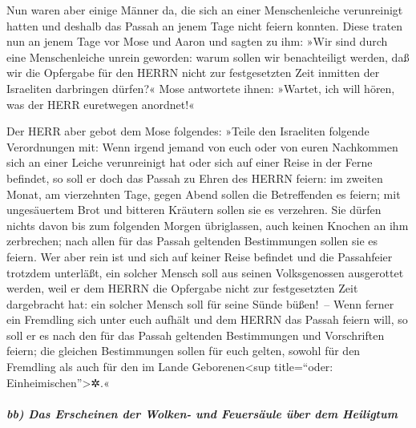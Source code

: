 Nun waren aber einige Männer da, die sich an einer
Menschenleiche verunreinigt hatten und deshalb das Passah an jenem Tage
nicht feiern konnten. Diese traten nun an jenem Tage vor Mose und Aaron
und sagten zu ihm: »Wir sind durch eine Menschenleiche
unrein geworden: warum sollen wir benachteiligt werden, daß wir die
Opfergabe für den HERRN nicht zur festgesetzten Zeit inmitten der
Israeliten darbringen dürfen?« Mose antwortete ihnen:
»Wartet, ich will hören, was der HERR euretwegen anordnet!«

Der HERR aber gebot dem Mose folgendes:
»Teile den Israeliten folgende Verordnungen mit: Wenn
irgend jemand von euch oder von euren Nachkommen sich an einer Leiche
verunreinigt hat oder sich auf einer Reise in der Ferne befindet, so
soll er doch das Passah zu Ehren des HERRN feiern: im
zweiten Monat, am vierzehnten Tage, gegen Abend sollen die Betreffenden
es feiern; mit ungesäuertem Brot und bitteren Kräutern sollen sie es
verzehren. Sie dürfen nichts davon bis zum folgenden
Morgen übriglassen, auch keinen Knochen an ihm zerbrechen; nach allen
für das Passah geltenden Bestimmungen sollen sie es feiern.
Wer aber rein ist und sich auf keiner Reise befindet und
die Passahfeier trotzdem unterläßt, ein solcher Mensch soll aus seinen
Volksgenossen ausgerottet werden, weil er dem HERRN die Opfergabe nicht
zur festgesetzten Zeit dargebracht hat: ein solcher Mensch soll für
seine Sünde büßen!~-- Wenn ferner ein Fremdling sich
unter euch aufhält und dem HERRN das Passah feiern will, so soll er es
nach den für das Passah geltenden Bestimmungen und Vorschriften feiern;
die gleichen Bestimmungen sollen für euch gelten, sowohl für den
Fremdling als auch für den im Lande Geborenen\textless sup title=``oder:
Einheimischen''\textgreater✲.«

\hypertarget{bb-das-erscheinen-der-wolken--und-feuersuxe4ule-uxfcber-dem-heiligtum}{%
\subparagraph{bb) Das Erscheinen der Wolken- und Feuersäule über dem
Heiligtum}\label{bb-das-erscheinen-der-wolken--und-feuersuxe4ule-uxfcber-dem-heiligtum}}

